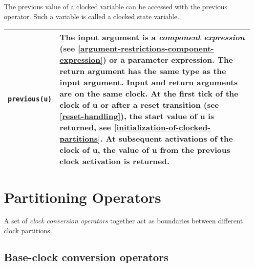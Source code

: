 The previous value of a clocked variable can be accessed with the
previous operator. Such a variable is called a clocked state variable.

\begin{longtable}[]{|l|p{12cm}|}
\hline \endhead
\lstinline!previous(u)! & The input argument is a \emph{component expression} (see
\cref{argument-restrictions-component-expression}) or a parameter expression. The return argument has the
same type as the input argument. Input and return arguments are on the
same clock. At the first tick of the clock of u or after a reset
transition (see \cref{reset-handling}), the start value of u is returned, see
\cref{initialization-of-clocked-partitions}. At subsequent activations of the clock of u, the value of
u from the previous clock activation is returned.\\ \hline
\end{longtable}

\section{Partitioning Operators}\label{partitioning-operators}

A set of \emph{clock conversion operators} together act as boundaries
between different clock partitions.

\subsection{Base-clock conversion operators}\label{base-clock-conversion-operators}

